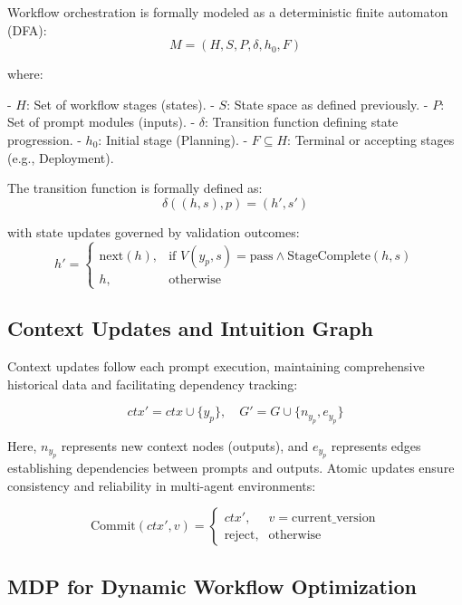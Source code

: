\documentclass[11pt,a4paper]{article}
\begin{document}
Workflow orchestration is formally modeled as a deterministic finite automaton (DFA):
\[
M = (H, S, P, \delta, h_0, F)
\]

where:

- \( H \): Set of workflow stages (states).
- \( S \): State space as defined previously.
- \( P \): Set of prompt modules (inputs).
- \( \delta \): Transition function defining state progression.
- \( h_0 \): Initial stage (Planning).
- \( F \subseteq H \): Terminal or accepting stages (e.g., Deployment).

The transition function is formally defined as:
\[
\delta((h, s), p) = (h', s') 
\]

with state updates governed by validation outcomes:
\[
h' = \begin{cases}
    \text{next}(h), & \text{if } V(y_p, s) = \text{pass} \wedge \text{StageComplete}(h, s)\\[4pt]
    h, & \text{otherwise}
\end{cases}
\]

\subsection{Context Updates and Intuition Graph}
\label{subsec:context_updates}

Context updates follow each prompt execution, maintaining comprehensive historical data and facilitating dependency tracking:

\[
ctx' = ctx \cup \{y_p\},\quad G' = G \cup \{n_{y_p}, e_{y_p}\}
\]

Here, \( n_{y_p} \) represents new context nodes (outputs), and \( e_{y_p} \) represents edges establishing dependencies between prompts and outputs. Atomic updates ensure consistency and reliability in multi-agent environments:

\[
\text{Commit}(ctx', v) = 
\begin{cases}
    ctx', & v = \text{current\_version}\\[4pt]
    \text{reject}, & \text{otherwise}
\end{cases}
\]

\subsection{MDP for Dynamic Workflow Optimization}
\label{subsec:mdp_modeling}
\end{document}
